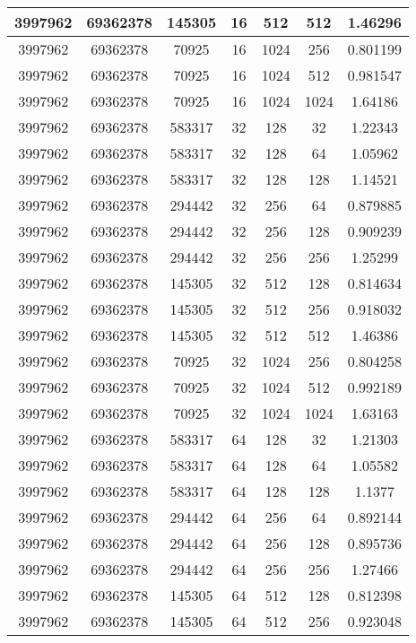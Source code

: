 \documentclass[9pt]{article}
\begin{document}
\begin{tabular}{|c|c|c|c|c|c|c| }
\hline
3997962  & 69362378  & 145305  & 16  & 512  & 512  & 1.46296 \\
\hline
3997962  & 69362378  & 70925  & 16  & 1024  & 256  & 0.801199 \\
\hline
3997962  & 69362378  & 70925  & 16  & 1024  & 512  & 0.981547 \\
\hline
3997962  & 69362378  & 70925  & 16  & 1024  & 1024  & 1.64186 \\
\hline
3997962  & 69362378  & 583317  & 32  & 128  & 32  & 1.22343 \\
\hline
3997962  & 69362378  & 583317  & 32  & 128  & 64  & 1.05962 \\
\hline
3997962  & 69362378  & 583317  & 32  & 128  & 128  & 1.14521 \\
\hline
3997962  & 69362378  & 294442  & 32  & 256  & 64  & 0.879885 \\
\hline
3997962  & 69362378  & 294442  & 32  & 256  & 128  & 0.909239 \\
\hline
3997962  & 69362378  & 294442  & 32  & 256  & 256  & 1.25299 \\
\hline
3997962  & 69362378  & 145305  & 32  & 512  & 128  & 0.814634 \\
\hline
3997962  & 69362378  & 145305  & 32  & 512  & 256  & 0.918032 \\
\hline
3997962  & 69362378  & 145305  & 32  & 512  & 512  & 1.46386 \\
\hline
3997962  & 69362378  & 70925  & 32  & 1024  & 256  & 0.804258 \\
\hline
3997962  & 69362378  & 70925  & 32  & 1024  & 512  & 0.992189 \\
\hline
3997962  & 69362378  & 70925  & 32  & 1024  & 1024  & 1.63163 \\
\hline
3997962  & 69362378  & 583317  & 64  & 128  & 32  & 1.21303 \\
\hline
3997962  & 69362378  & 583317  & 64  & 128  & 64  & 1.05582 \\
\hline
3997962  & 69362378  & 583317  & 64  & 128  & 128  & 1.1377 \\
\hline
3997962  & 69362378  & 294442  & 64  & 256  & 64  & 0.892144 \\
\hline
3997962  & 69362378  & 294442  & 64  & 256  & 128  & 0.895736 \\
\hline
3997962  & 69362378  & 294442  & 64  & 256  & 256  & 1.27466 \\
\hline
3997962  & 69362378  & 145305  & 64  & 512  & 128  & 0.812398 \\
\hline
3997962  & 69362378  & 145305  & 64  & 512  & 256  & 0.923048 \\

\end{tabular}
\end{document}
